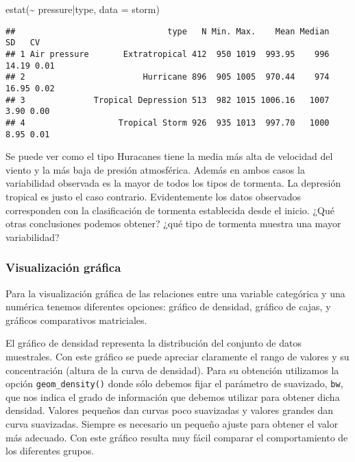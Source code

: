 \documentclass[
]{book}
\newenvironment{Shaded}{\begin{snugshade}}{\end{snugshade}}
\newcommand{\AttributeTok}[1]{\textcolor[rgb]{0.77,0.63,0.00}{#1}}
\newcommand{\FunctionTok}[1]{\textcolor[rgb]{0.00,0.00,0.00}{#1}}
\newcommand{\NormalTok}[1]{#1}
\newcommand{\SpecialCharTok}[1]{\textcolor[rgb]{0.00,0.00,0.00}{#1}}
\begin{document}
\begin{Shaded}
\begin{Highlighting}[]
\FunctionTok{estat}\NormalTok{(}\SpecialCharTok{\textasciitilde{}}\NormalTok{ pressure}\SpecialCharTok{|}\NormalTok{type, }\AttributeTok{data =}\NormalTok{ storm)}
\end{Highlighting}
\end{Shaded}

\begin{verbatim}
##                               type   N Min. Max.    Mean Median    SD   CV
## 1 Air pressure       Extratropical 412  950 1019  993.95    996 14.19 0.01
## 2                        Hurricane 896  905 1005  970.44    974 16.95 0.02
## 3              Tropical Depression 513  982 1015 1006.16   1007  3.90 0.00
## 4                   Tropical Storm 926  935 1013  997.70   1000  8.95 0.01
\end{verbatim}

Se puede ver como el tipo Huracanes tiene la media más alta de velocidad del viento y la más baja de presión atmosférica. Además en ambos casos la variabilidad observada es la mayor de todos los tipos de tormenta. La depresión tropical es justo el caso contrario. Evidentemente los datos observados corresponden con la clasificación de tormenta establecida desde el inicio. ¿Qué otras conclusiones podemos obtener? ¿qué tipo de tormenta muestra una mayor variabilidad?

\hypertarget{visualizaciuxf3n-gruxe1fica-3}{%
\subsubsection{Visualización gráfica}\label{visualizaciuxf3n-gruxe1fica-3}}

Para la visualización gráfica de las relaciones entre una variable categórica y una numérica tenemos diferentes opciones: gráfico de densidad, gráfico de cajas, y gráficos comparativos matriciales.

El gráfico de densidad representa la distribución del conjunto de datos muestrales. Con este gráfico se puede apreciar claramente el rango de valores y su concentración (altura de la curva de densidad). Para su obtención utilizamos la opción \texttt{geom\_density()} donde sólo debemos fijar el parámetro de suavizado, \texttt{bw}, que nos indica el grado de información que debemos utilizar para obtener dicha densidad. Valores pequeños dan curvas poco suavizadas y valores grandes dan curva suavizadas. Siempre es necesario un pequeño ajuste para obtener el valor más adecuado. Con este gráfico resulta muy fácil comparar el comportamiento de los diferentes grupos.
\end{document}
